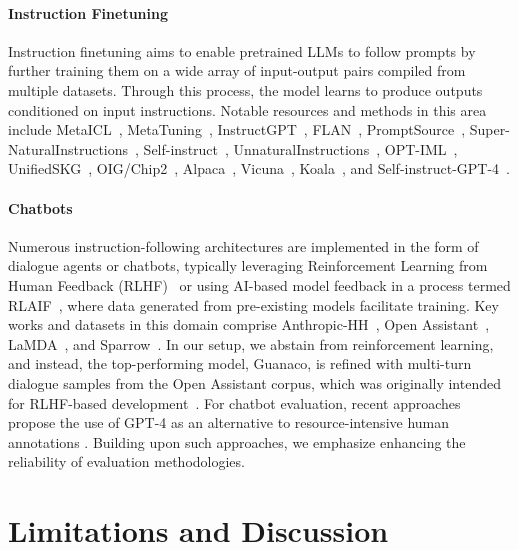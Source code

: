 \paragraph{Instruction Finetuning} Instruction finetuning aims to enable pretrained LLMs to follow prompts by further training them on a wide array of input-output pairs compiled from multiple datasets. Through this process, the model learns to produce outputs conditioned on input instructions. Notable resources and methods in this area include MetaICL~\citep{min2021metaicl}, MetaTuning~\citep{zhong2021adapting}, InstructGPT~\citep{ouyang2022training}, FLAN~\citep{wei2021finetuned,chung2022scaling}, PromptSource~\citep{bach2022promptsource}, Super-NaturalInstructions~\citep{wang2022super,sanh2021multitask}, Self-instruct~\citep{wang2022self}, UnnaturalInstructions~\citep{honovich2022unnatural}, OPT-IML~\citep{iyer2022opt}, UnifiedSKG~\citep{xie2022unifiedskg}, OIG/Chip2~\citep{laion2023}, Alpaca~\citep{alpaca}, Vicuna~\citep{vicuna2023}, Koala~\citep{koala_blogpost_2023}, and Self-instruct-GPT-4~\citep{peng2023instruction}.

\paragraph{Chatbots} Numerous instruction-following architectures are implemented in the form of dialogue agents or chatbots, typically leveraging Reinforcement Learning from Human Feedback (RLHF)~\citep{christiano2017deep} or using AI-based model feedback in a process termed RLAIF~\citep{bai2022constitutional}, where data generated from pre-existing models facilitate training. Key works and datasets in this domain comprise Anthropic-HH~\citep{askell2021general,bai2022training}, Open Assistant~\citep{kopf2023openassistant}, LaMDA~\citep{thoppilan2022lamda}, and Sparrow~\citep{glaese2022improving}. In our setup, we abstain from reinforcement learning, and instead, the top-performing model, Guanaco, is refined with multi-turn dialogue samples from the Open Assistant corpus, which was originally intended for RLHF-based development~\citep{kopf2023openassistant}. For chatbot evaluation, recent approaches propose the use of GPT-4 as an alternative to resource-intensive human annotations \citep{vicuna2023,peng2023instruction}. Building upon such approaches, we emphasize enhancing the reliability of evaluation methodologies.

\section{Limitations and Discussion}

